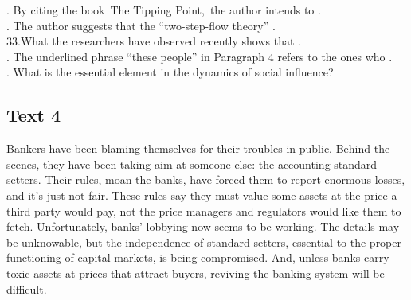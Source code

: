 \begin{questions} . By citing the book The Tipping Point, the author intends to .
\\ . The author suggests that the “two-step-flow theory” .
\\ \question  33.What the researchers have observed recently shows that .
\\ . The underlined phrase “these people” in Paragraph 4 refers to the ones who .
\\ . What is the essential element in the dynamics of social influence?
\\ \end{questions}      \subsection{Text 4}
Bankers have been blaming themselves for their troubles in public. Behind the scenes, they have been taking aim at someone else: the accounting standard-setters. Their rules, moan the banks, have forced them to report enormous losses, and it's just not fair. These rules say they must value some assets at the price a third party would pay, not the price managers and regulators would like them to fetch.
Unfortunately, banks' lobbying now seems to be working. The details may be unknowable, but the independence of standard-setters, essential to the proper functioning of capital markets, is being compromised. And, unless banks carry toxic assets at prices that attract buyers, reviving the banking system will be difficult.
